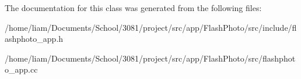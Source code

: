 The documentation for this class was generated from the following files\+:\begin{DoxyCompactItemize}
\item 
/home/liam/\+Documents/\+School/3081/project/src/app/\+Flash\+Photo/src/include/flashphoto\+\_\+app.\+h\item 
/home/liam/\+Documents/\+School/3081/project/src/app/\+Flash\+Photo/src/flashphoto\+\_\+app.\+cc\end{DoxyCompactItemize}
